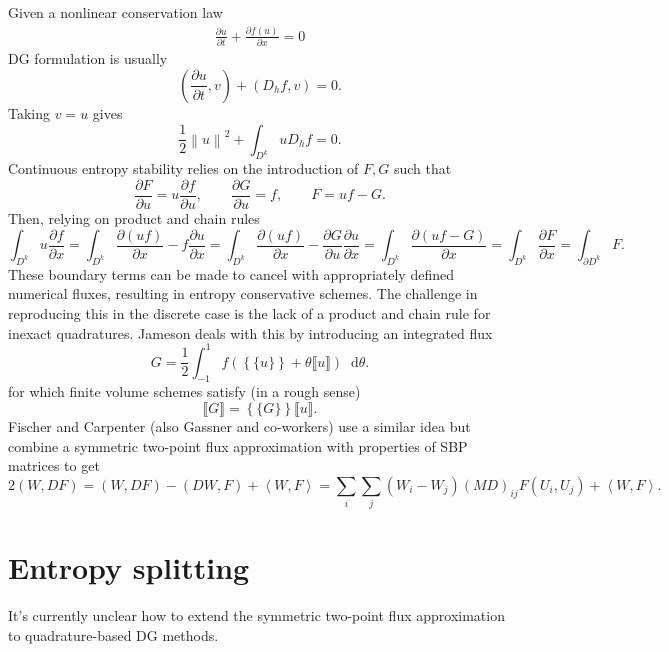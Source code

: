 \documentclass[preprint,10pt]{article}
\newcommand{\pd}[2]{\frac{\partial#1}{\partial#2}}
\newcommand{\nor}[1]{\left\| #1 \right\|}
\newcommand{\LRp}[1]{\left( #1 \right)}
\newcommand{\LRs}[1]{\left[ #1 \right]}
\newcommand{\LRa}[1]{\left\langle #1 \right\rangle}
\newcommand{\LRc}[1]{\left\{ #1 \right\}}
\newcommand{\jump}[1] {\ensuremath{\llbracket#1\rrbracket}}
\newcommand{\avg}[1] {\ensuremath{\LRc{\!\{#1\}\!}}}
\newcommand*\diff[1]{\mathop{}\!{\mathrm{d}#1}}
\begin{document}
Given a nonlinear conservation law
\begin{align*}
\pd{u}{t} + \pd{f(u)}{x} = 0
\end{align*}
DG formulation is usually
\[
\LRp{\pd{u}{t},v} + \LRp{D_h f,v} = 0.
\]
Taking $v = u$ gives
\[
\frac{1}{2}\nor{u}^2 + \int_{D^k}{u D_h f} = 0.
\]
Continuous entropy stability relies on the introduction of $F,G$ such that
\[
\pd{F}{u} = u\pd{f}{u}, \qquad \pd{G}{u} = f, \qquad F = uf - G.
\]
Then, relying on product and chain rules
\[
\int_{D^k}{u \pd{f}{x}} = \int_{D^k}{\pd{(uf)}{x} - f\pd{u}{x}} = \int_{D^k}{\pd{(uf)}{x} - \pd{G}{u}\pd{u}{x}} =  \int_{D^k}{\pd{\LRp{uf-G}}{x}} = \int_{D^k}{\pd{F}{x}} = \int_{\partial D^k} F.
\]
These boundary terms can be made to cancel with appropriately defined numerical fluxes, resulting in entropy conservative schemes.  The challenge in reproducing this in the discrete case is the lack of a product and chain rule for inexact quadratures.  Jameson deals with this by introducing an integrated flux
\[
G = \frac{1}{2}\int_{-1}^1 f \LRp{ \avg{u} + \theta \jump{u}} \diff \theta.
\]
for which finite volume schemes satisfy (in a rough sense)
\[
\jump{G} = \avg{G} \jump{u}.
\]
Fischer and Carpenter (also Gassner and co-workers) use a similar idea but combine a symmetric two-point flux approximation with properties of SBP matrices to get 
\[
2\LRp{W,DF} = \LRp{W,DF} - \LRp{DW,F} + \LRa{W,F} =  \sum_i \sum_j (W_i-W_j) (MD)_{ij} F(U_i,U_j) + \LRa{W,F}.
\]

\section{Entropy splitting}

It's currently unclear how to extend the symmetric two-point flux approximation to quadrature-based DG methods.  




\end{document}
